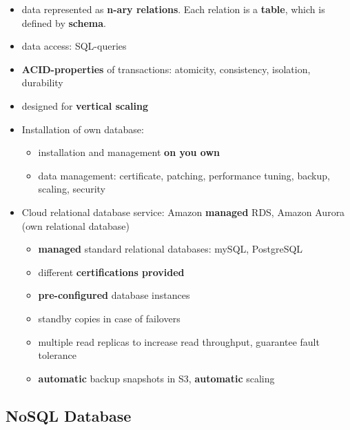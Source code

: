 \begin{itemize}
	\item data represented as \textbf{n-ary relations}. Each relation is a \textbf{table}, which is defined by \textbf{schema}.
	\item data access: SQL-queries
	\item \textbf{ACID-properties} of transactions: atomicity, consistency, isolation, durability
	\item designed for \textbf{vertical scaling}
	\item Installation of own database:
	\begin{itemize}
		\item installation and management \textbf{on you own}
		\item data management: certificate, patching, performance tuning, backup, scaling, security 
	\end{itemize}
	\item Cloud relational database service: Amazon \textbf{managed} RDS, Amazon Aurora (own relational database)
	\begin{itemize}
		\item \textbf{managed} standard relational databases: mySQL, PostgreSQL
		\item different \textbf{certifications provided}
		\item \textbf{pre-configured} database instances
		\item standby copies in case of failovers
		\item multiple read replicas to increase read throughput, guarantee fault tolerance
		\item \textbf{automatic} backup snapshots in S3, \textbf{automatic} scaling
	\end{itemize}
\end{itemize}

\subsection{NoSQL Database}

